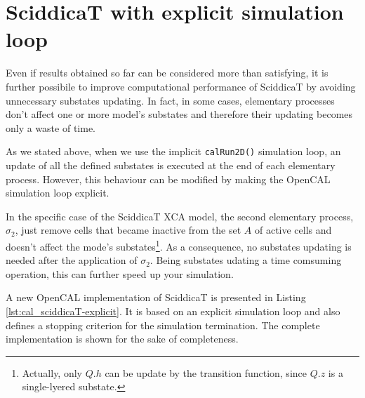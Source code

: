 \section{SciddicaT with explicit simulation loop}
Even if results obtained so far can be considered more than
satisfying, it is further possibile to improve computational
performance of SciddicaT by avoiding unnecessary substates
updating. In fact, in some cases, elementary processes don't affect
one or more model's substates and therefore their updating becomes
only a waste of time.

As we stated above, when we use the implicit \verb'calRun2D()'
simulation loop, an update of all the defined substates is executed at
the end of each elementary process. However, this behaviour can be
modified by making the OpenCAL simulation loop explicit.

In the specific case of the SciddicaT XCA model, the second elementary
process, $\sigma_2$, just remove cells that became inactive from the
set $A$ of active cells and doesn't affect the mode's
substates\footnote{Actually, only $Q.h$ can be update by the
  transition function, since $Q.z$ is a single-lyered substate.}. As a
consequence, no substates updating is needed after the application of
$\sigma_2$. Being substates udating a time comsuming operation, this
can further speed up your simulation.

A new OpenCAL implementation of SciddicaT is presented in Listing
\ref{lst:cal_sciddicaT-explicit}. It is based on an explicit
simulation loop and also defines a stopping criterion for the
simulation termination. The complete implementation is shown for the
sake of completeness.





